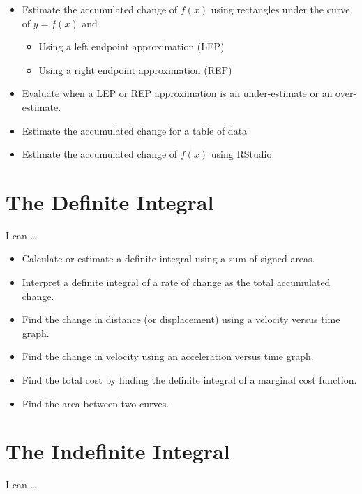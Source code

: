 \documentclass[
]{book}
\providecommand{\tightlist}{%
  \setlength{\itemsep}{0pt}\setlength{\parskip}{0pt}}
\begin{document}
\begin{itemize}
\tightlist
\item
  Estimate the accumulated change of \(f(x)\) using rectangles under the curve of \(y=f(x)\) and

  \begin{itemize}
  \tightlist
  \item
    Using a left endpoint approximation (LEP)
  \item
    Using a right endpoint approximation (REP)
  \end{itemize}
\item
  Evaluate when a LEP or REP approximation is an under-estimate or an over-estimate.
\item
  Estimate the accumulated change for a table of data
\item
  Estimate the accumulated change of \(f(x)\) using RStudio
\end{itemize}

\hypertarget{the-definite-integral-1}{%
\section{The Definite Integral}\label{the-definite-integral-1}}

I can \ldots{}

\begin{itemize}
\tightlist
\item
  Calculate or estimate a definite integral using a sum of signed areas.
\item
  Interpret a definite integral of a rate of change as the total accumulated change.
\item
  Find the change in distance (or displacement) using a velocity versus time graph.
\item
  Find the change in velocity using an acceleration versus time graph.
\item
  Find the total cost by finding the definite integral of a marginal cost function.
\item
  Find the area between two curves.
\end{itemize}

\hypertarget{the-indefinite-integral-1}{%
\section{The Indefinite Integral}\label{the-indefinite-integral-1}}

I can \ldots{}
\end{document}
